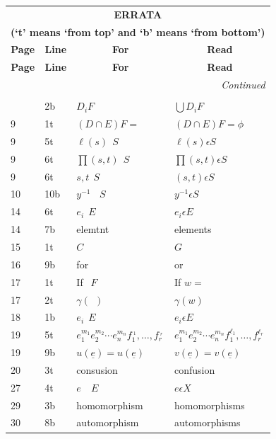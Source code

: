 \begin{longtable}{|l|l|p{3.7cm}|p{3.9cm}|}
 \multicolumn{4}{c}{\textbf{\Large ERRATA}}\\[10pt]
\multicolumn{4}{c}{\textbf{(`t' means `from top' and `b' means `from
    bottom')}}\\[5pt] 
\hline
\multicolumn{1}{|c|}{\textbf{Page}} & \multicolumn{1}{c|}{\textbf{Line}}
& \multicolumn{1}{c|}{\textbf{For}} &
\multicolumn{1}{c|}{\textbf{Read}}\\ 
\hline
\endfirsthead
\hline
\multicolumn{1}{|c|}{\textbf{Page}} & \multicolumn{1}{c|}{\textbf{Line}}
& \multicolumn{1}{c|}{\textbf{For}} &
\multicolumn{1}{c|}{\textbf{Read}}\\ 
\hline
\endhead
\hline
\multicolumn{4}{r}{\itshape Continued}\\
\endfoot
\hline
\multicolumn{4}{r}{}\\
\endlastfoot
7 & 2b & $D_i F$ & $\bigcup D_i F$\\
9 & 1t & $(D \cap E) F= $ & $(D \cap E)F= \phi $\\
9 & 5t & $\ell(s)~~S$ & $\ell (s)\epsilon S$\\
9 & 6t & $\prod (s, t) ~~ S$ & $\prod (s, t) \epsilon S$\\
9 & 6t & $s, t ~~S$ & $(s,t) \epsilon S$\\
10 & 10b & $y^{-1} ~~~~ S$ & $y^{-1} \epsilon S$\\
14 & 6t & $e_i ~~E$ & $e_i \epsilon E$\\
14 & 7b & elemtnt & elements\\
15 & 1t & $C$ & $G$\\
16 & 9b & for & or\\
17 & 1t & If $~~F$ & If $w=$\\
17 & 2t & $\gamma (~~)$ & $\gamma (w)$\\
18 & 1b & $e_i ~~E$ & $e_i \epsilon E$\\[8pt]
19 & 5t & $e^{m_1}_1 e^{m_2}_2 \cdots e^{m_n}_n f_1^{{~}_1}, \ldots, 
f^{{~}_r}_r$ & $e^{m_1}_1 e^{m_2}_2 \cdots e^{m_n}_n f_1^{\ell_1},
\ldots,  f^{\ell_r}_r$ \\[5pt]
19 & 9b & $u(\underline{e}) = u(\underline{e})$ & $v(\underline{e}) =
v(\underline{e})$ \\
20 & 3t & consusion & confusion\\
27 & 4t & $e \quad E$ & $e \epsilon X$\\
29 & 3b & homomorphism & homomorphisms\\
30 & 8b & automorphism & automorphisms\\[5pt]

\end{longtable}
